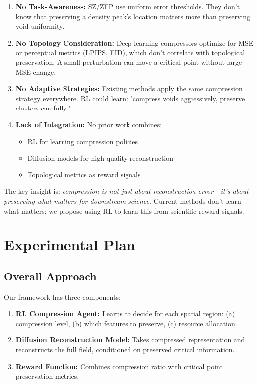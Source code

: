 \documentclass[11pt]{article}
\begin{document}
\begin{enumerate}
    \item \textbf{No Task-Awareness:} SZ/ZFP use uniform error thresholds. They don't know that preserving a density peak's location matters more than preserving void uniformity.

    \item \textbf{No Topology Consideration:} Deep learning compressors optimize for MSE or perceptual metrics (LPIPS, FID), which don't correlate with topological preservation. A small perturbation can move a critical point without large MSE change.

    \item \textbf{No Adaptive Strategies:} Existing methods apply the same compression strategy everywhere. RL could learn: "compress voids aggressively, preserve clusters carefully."

    \item \textbf{Lack of Integration:} No prior work combines:
    \begin{itemize}
        \item RL for learning compression policies
        \item Diffusion models for high-quality reconstruction
        \item Topological metrics as reward signals
    \end{itemize}
\end{enumerate}

The key insight is: \textit{compression is not just about reconstruction error—it's about preserving what matters for downstream science.} Current methods don't learn what matters; we propose using RL to learn this from scientific reward signals.

\section{Experimental Plan}

\subsection{Overall Approach}

Our framework has three components:

\begin{enumerate}
    \item \textbf{RL Compression Agent:} Learns to decide for each spatial region: (a) compression level, (b) which features to preserve, (c) resource allocation.

    \item \textbf{Diffusion Reconstruction Model:} Takes compressed representation and reconstructs the full field, conditioned on preserved critical information.

    \item \textbf{Reward Function:} Combines compression ratio with critical point preservation metrics.
\end{enumerate}
\end{document}
